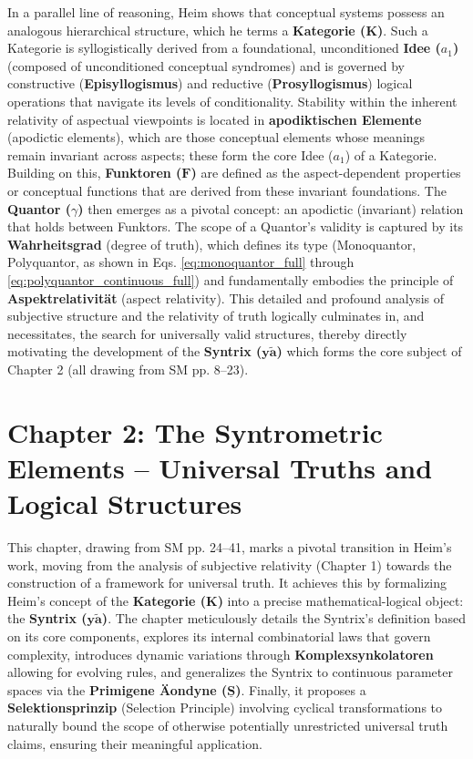 \documentclass[12pt]{article}
\newcommand{\kategorie}{\bm{K}}
\newcommand{\syntrix}{\bm{y\widetilde{a}}}
\newcommand{\conceptualsyndrome}{a}
\newcommand{\funktor}{\bm{F}}
\begin{document}
In a parallel line of reasoning, Heim shows that conceptual systems possess an analogous hierarchical structure, which he terms a \textbf{Kategorie (\(\kategorie\))}. Such a Kategorie is syllogistically derived from a foundational, unconditioned \textbf{Idee (\(\conceptualsyndrome_1\))} (composed of unconditioned conceptual syndromes) and is governed by constructive (\textbf{Episyllogismus}) and reductive (\textbf{Prosyllogismus}) logical operations that navigate its levels of conditionality. Stability within the inherent relativity of aspectual viewpoints is located in \textbf{apodiktischen Elemente} (apodictic elements), which are those conceptual elements whose meanings remain invariant across aspects; these form the core Idee (\(\conceptualsyndrome_1\)) of a Kategorie. Building on this, \textbf{Funktoren (\(\funktor\))} are defined as the aspect-dependent properties or conceptual functions that are derived from these invariant foundations. The \textbf{Quantor (\(\gamma\))} then emerges as a pivotal concept: an apodictic (invariant) relation that holds between Funktors. The scope of a Quantor's validity is captured by its \textbf{Wahrheitsgrad} (degree of truth), which defines its type (Monoquantor, Polyquantor, as shown in Eqs. \eqref{eq:monoquantor_full} through \eqref{eq:polyquantor_continuous_full}) and fundamentally embodies the principle of \textbf{Aspektrelativität} (aspect relativity). This detailed and profound analysis of subjective structure and the relativity of truth logically culminates in, and necessitates, the search for universally valid structures, thereby directly motivating the development of the \textbf{Syntrix (\(\syntrix\))} which forms the core subject of Chapter 2 (all drawing from SM pp. 8--23).

\clearpage

\section{Chapter 2: The Syntrometric Elements – Universal Truths and Logical Structures}
\label{sec:chapter2}

This chapter, drawing from SM pp. 24--41, marks a pivotal transition in Heim's work, moving from the analysis of subjective relativity (Chapter 1) towards the construction of a framework for universal truth. It achieves this by formalizing Heim's concept of the \textbf{Kategorie (\(\kategorie\))} into a precise mathematical-logical object: the \textbf{Syntrix (\(\syntrix\))}. The chapter meticulously details the Syntrix's definition based on its core components, explores its internal combinatorial laws that govern complexity, introduces dynamic variations through \textbf{Komplexsynkolatoren} allowing for evolving rules, and generalizes the Syntrix to continuous parameter spaces via the \textbf{Primigene \"{A}ondyne (\(\underline{\bm{S}}\))}. Finally, it proposes a \textbf{Selektionsprinzip} (Selection Principle) involving cyclical transformations to naturally bound the scope of otherwise potentially unrestricted universal truth claims, ensuring their meaningful application.
\end{document}
